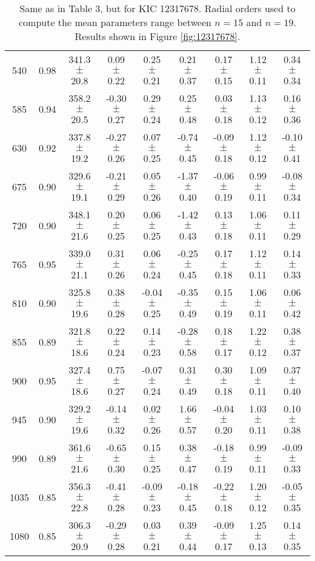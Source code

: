 \documentclass[twocolumn]{aastex61}%
\begin{document}
\begin{table*}[ht]
\begin{tabular}{ccc|ccccc|c}
540 & 0.98 & 341.3 $\pm$ 20.8 & 0.09 $\pm$ 0.22 & 0.25 $\pm$ 0.21 & 0.21 $\pm$ 0.37 & 0.17 $\pm$ 0.15 & 1.12 $\pm$ 0.11 & 0.34 $\pm$ 0.34\\
585 & 0.94 & 358.2 $\pm$ 20.5 & -0.30 $\pm$ 0.27 & 0.29 $\pm$ 0.24 & 0.25 $\pm$ 0.48 & 0.03 $\pm$ 0.18 & 1.13 $\pm$ 0.12 & 0.16 $\pm$ 0.36\\
630 & 0.92 & 337.8 $\pm$ 19.2 & -0.27 $\pm$ 0.26 & 0.07 $\pm$ 0.25 & -0.74 $\pm$ 0.45 & -0.09 $\pm$ 0.18 & 1.12 $\pm$ 0.12 & -0.10 $\pm$ 0.41\\
675 & 0.90 & 329.6 $\pm$ 19.1 & -0.21 $\pm$ 0.29 & 0.05 $\pm$ 0.26 & -1.37 $\pm$ 0.40 & -0.06 $\pm$ 0.19 & 0.99 $\pm$ 0.11 & -0.08 $\pm$ 0.34\\
720 & 0.90 & 348.1 $\pm$ 21.6 & 0.20 $\pm$ 0.25 & 0.06 $\pm$ 0.25 & -1.42 $\pm$ 0.43 & 0.13 $\pm$ 0.18 & 1.06 $\pm$ 0.11 & 0.11 $\pm$ 0.29\\
765 & 0.95 & 339.0 $\pm$ 21.1 & 0.31 $\pm$ 0.26 & 0.06 $\pm$ 0.24 & -0.25 $\pm$ 0.45 & 0.17 $\pm$ 0.18 & 1.12 $\pm$ 0.11 & 0.14 $\pm$ 0.33\\
810 & 0.90 & 325.8 $\pm$ 19.6 & 0.38 $\pm$ 0.28 & -0.04 $\pm$ 0.25 & -0.35 $\pm$ 0.49 & 0.15 $\pm$ 0.19 & 1.06 $\pm$ 0.11 & 0.06 $\pm$ 0.42\\
855 & 0.89 & 321.8 $\pm$ 18.6 & 0.22 $\pm$ 0.24 & 0.14 $\pm$ 0.23 & -0.28 $\pm$ 0.58 & 0.18 $\pm$ 0.17 & 1.22 $\pm$ 0.12 & 0.38 $\pm$ 0.37\\
900 & 0.95 & 327.4 $\pm$ 18.6 & 0.75 $\pm$ 0.27 & -0.07 $\pm$ 0.24 & 0.31 $\pm$ 0.49 & 0.30 $\pm$ 0.18 & 1.09 $\pm$ 0.11 & 0.37 $\pm$ 0.40\\
945 & 0.90 & 329.2 $\pm$ 19.6 & -0.14 $\pm$ 0.32 & 0.02 $\pm$ 0.26 & 1.66 $\pm$ 0.57 & -0.04 $\pm$ 0.20 & 1.03 $\pm$ 0.11 & 0.10 $\pm$ 0.38\\
990 & 0.89 & 361.6 $\pm$ 21.6 & -0.65 $\pm$ 0.30 & 0.15 $\pm$ 0.25 & 0.38 $\pm$ 0.47 & -0.18 $\pm$ 0.19 & 0.99 $\pm$ 0.11 & -0.09 $\pm$ 0.33\\
1035 & 0.85 & 356.3 $\pm$ 22.8 & -0.41 $\pm$ 0.28 & -0.09 $\pm$ 0.23 & -0.18 $\pm$ 0.45 & -0.22 $\pm$ 0.18 & 1.20 $\pm$ 0.12 & -0.05 $\pm$ 0.35\\
1080 & 0.85 & 306.3 $\pm$ 20.9 & -0.29 $\pm$ 0.28 & 0.03 $\pm$ 0.21 & 0.39 $\pm$ 0.44 & -0.09 $\pm$ 0.17 & 1.25 $\pm$ 0.13 & 0.14 $\pm$ 0.35\\
\end{tabular}
\caption{Same as in Table 3, but for KIC 12317678. Radial orders used to compute the mean parameters range between $n=15$ and $n=19$. Results shown in Figure \ref{fig:12317678}.}\label{tab:12317678}\vspace{-1.5cm}
\end{table*}
\end{document}
